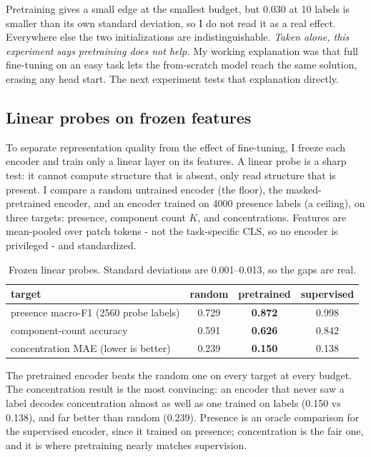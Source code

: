 \documentclass[11pt]{article}
\begin{document}
Pretraining gives a small edge at the smallest budget, but $0.030$ at 10 labels is smaller
than its own standard deviation, so I do not read it as a real effect. Everywhere else the two
initializations are indistinguishable. \emph{Taken alone, this experiment says pretraining
does not help.} My working explanation was that full fine-tuning on an easy task lets the
from-scratch model reach the same solution, erasing any head start. The next experiment tests
that explanation directly.

\subsection{Linear probes on frozen features}
\label{sec:probes}

To separate representation quality from the effect of fine-tuning, I freeze each encoder and
train only a linear layer on its features. A linear probe is a sharp test: it cannot compute
structure that is absent, only read structure that is present. I compare a random untrained
encoder (the floor), the masked-pretrained encoder, and an encoder trained on 4000 presence
labels (a ceiling), on three targets: presence, component count $K$, and concentrations.
Features are mean-pooled over patch tokens - not the task-specific CLS, so no encoder is
privileged - and standardized.

\begin{table}[h]
\centering
\begin{tabular}{lccc}
\toprule
target & random & pretrained & supervised \\
\midrule
presence macro-F1 (2560 probe labels) & 0.729 & \textbf{0.872} & 0.998 \\
component-count accuracy              & 0.591 & \textbf{0.626} & 0.842 \\
concentration MAE (lower is better)   & 0.239 & \textbf{0.150} & 0.138 \\
\bottomrule
\end{tabular}
\caption{Frozen linear probes. Standard deviations are 0.001--0.013, so the gaps are real.}
\end{table}

The pretrained encoder beats the random one on every target at every budget. The concentration
result is the most convincing: an encoder that never saw a label decodes concentration almost
as well as one trained on labels (0.150 vs 0.138), and far better than random (0.239).
Presence is an oracle comparison for the supervised encoder, since it trained on presence;
concentration is the fair one, and it is where pretraining nearly matches supervision.
\end{document}

